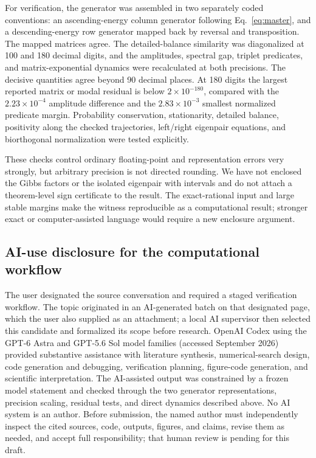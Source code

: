 \documentclass[aps,pre,reprint,superscriptaddress,nofootinbib]{revtex4-2}
\begin{document}
For verification, the generator was assembled in two separately coded conventions:
an ascending-energy column generator following Eq.~\eqref{eq:master}, and a
descending-energy row generator mapped back by reversal and transposition.  The
mapped matrices agree.  The detailed-balance similarity was diagonalized at 100
and 180 decimal digits, and the amplitudes, spectral gap, triplet predicates, and
matrix-exponential dynamics were recalculated at both precisions.  The decisive
quantities agree beyond 90 decimal places.  At 180 digits the largest reported
matrix or modal residual is below $2\times10^{-180}$, compared with the
$2.23\times10^{-4}$ amplitude difference and the $2.83\times10^{-3}$ smallest
normalized predicate margin.  Probability conservation, stationarity, detailed
balance, positivity along the checked trajectories, left/right eigenpair equations,
and biorthogonal normalization were tested explicitly.

These checks control ordinary floating-point and representation errors very strongly,
but arbitrary precision is not directed rounding.  We have not enclosed the Gibbs
factors or the isolated eigenpair with intervals and do not attach a theorem-level
sign certificate to the result.  The exact-rational input and large stable margins
make the witness reproducible as a computational result; stronger exact or
computer-assisted language would require a new enclosure argument.

\subsection{AI-use disclosure for the computational workflow}

The user designated the source conversation and required a staged verification
workflow.  The topic originated in an AI-generated batch on that designated page,
which the user also supplied as an attachment; a local AI supervisor then selected
this candidate and formalized its scope before research.  OpenAI Codex using the
GPT-6 Astra and GPT-5.6 Sol model families (accessed September 2026) provided
substantive assistance with
literature synthesis, numerical-search design, code generation and debugging,
verification planning, figure-code generation, and scientific interpretation.  The
AI-assisted output was constrained by a frozen model statement and checked through
the two generator representations, precision scaling, residual tests, and direct
dynamics described above.  No AI system is an author.  Before submission, the named
author must independently inspect the cited sources, code, outputs, figures, and
claims, revise them as needed, and accept full responsibility; that human review is
pending for this draft.
\end{document}
